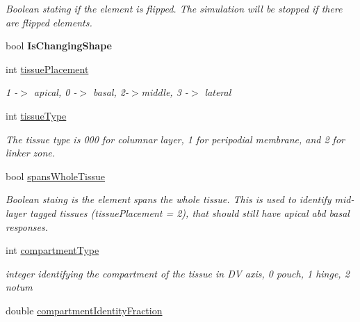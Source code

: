 \begin{DoxyCompactItemize}
\begin{DoxyCompactList}\small\item\em Boolean stating if the element is flipped. The simulation will be stopped if there are flipped elements. \end{DoxyCompactList}\item 
\hypertarget{classShapeBase_a994acea5e6f2cf92c94f485e7ba5afc9}{}bool {\bfseries Is\+Changing\+Shape}\label{classShapeBase_a994acea5e6f2cf92c94f485e7ba5afc9}

\item 
\hypertarget{classShapeBase_aff63b1fcb823bbfdb5b19fe78dea59b8}{}int \hyperlink{classShapeBase_aff63b1fcb823bbfdb5b19fe78dea59b8}{tissue\+Placement}\label{classShapeBase_aff63b1fcb823bbfdb5b19fe78dea59b8}

\begin{DoxyCompactList}\small\item\em 1 -\/$>$ apical, 0 -\/$>$ basal, 2-\/$>$middle, 3 -\/$>$ lateral \end{DoxyCompactList}\item 
\hypertarget{classShapeBase_a1d56f7eb3fed744adc268bc4da7a790f}{}int \hyperlink{classShapeBase_a1d56f7eb3fed744adc268bc4da7a790f}{tissue\+Type}\label{classShapeBase_a1d56f7eb3fed744adc268bc4da7a790f}

\begin{DoxyCompactList}\small\item\em The tissue type is 000 for columnar layer, 1 for peripodial membrane, and 2 for linker zone. \end{DoxyCompactList}\item 
\hypertarget{classShapeBase_adafe85bbee6173d2a321408cd8b63db3}{}bool \hyperlink{classShapeBase_adafe85bbee6173d2a321408cd8b63db3}{spans\+Whole\+Tissue}\label{classShapeBase_adafe85bbee6173d2a321408cd8b63db3}

\begin{DoxyCompactList}\small\item\em Boolean staing is the element spans the whole tissue. This is used to identify mid-\/layer tagged tissues (tissue\+Placement = 2), that should still have apical abd basal responses. \end{DoxyCompactList}\item 
\hypertarget{classShapeBase_a47bfa280bf33fc0557e8d804aab3936c}{}int \hyperlink{classShapeBase_a47bfa280bf33fc0557e8d804aab3936c}{compartment\+Type}\label{classShapeBase_a47bfa280bf33fc0557e8d804aab3936c}

\begin{DoxyCompactList}\small\item\em integer identifying the compartment of the tissue in D\+V axis, 0 pouch, 1 hinge, 2 notum \end{DoxyCompactList}\item 
\hypertarget{classShapeBase_aada8d021521dbe6815a887bc0cb28cc8}{}double \hyperlink{classShapeBase_aada8d021521dbe6815a887bc0cb28cc8}{compartment\+Identity\+Fraction}\label{classShapeBase_aada8d021521dbe6815a887bc0cb28cc8}


\end{DoxyCompactItemize}
